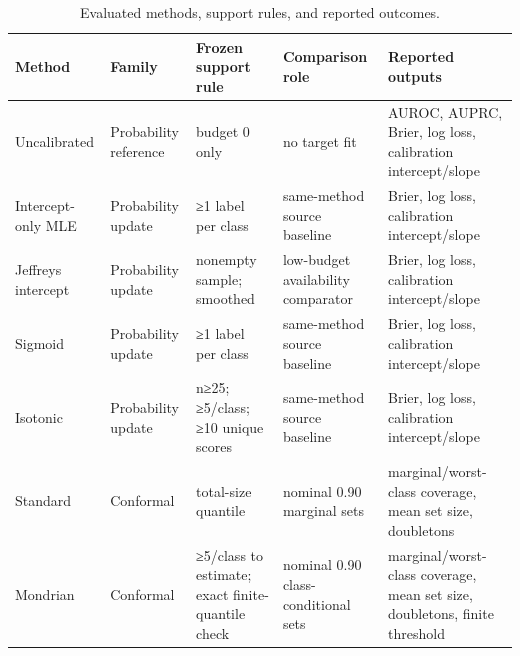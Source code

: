 \begin{table}[t]
\centering
\footnotesize
\begin{tabular}{lllll}
\toprule
Method & Family & Frozen support rule & Comparison role & Reported outputs \\
\midrule
Uncalibrated & Probability reference & budget 0 only & no target fit & AUROC, AUPRC, Brier, log loss, calibration intercept/slope \\
Intercept-only MLE & Probability update & ≥1 label per class & same-method source baseline & Brier, log loss, calibration intercept/slope \\
Jeffreys intercept & Probability update & nonempty sample; smoothed & low-budget availability comparator & Brier, log loss, calibration intercept/slope \\
Sigmoid & Probability update & ≥1 label per class & same-method source baseline & Brier, log loss, calibration intercept/slope \\
Isotonic & Probability update & n≥25; ≥5/class; ≥10 unique scores & same-method source baseline & Brier, log loss, calibration intercept/slope \\
Standard & Conformal & total-size quantile & nominal 0.90 marginal sets & marginal/worst-class coverage, mean set size, doubletons \\
Mondrian & Conformal & ≥5/class to estimate; exact finite-quantile check & nominal 0.90 class-conditional sets & marginal/worst-class coverage, mean set size, doubletons, finite threshold \\
\bottomrule
\end{tabular}
\caption{Evaluated methods, support rules, and reported outcomes.}
\label{tab:methods}
\end{table}
